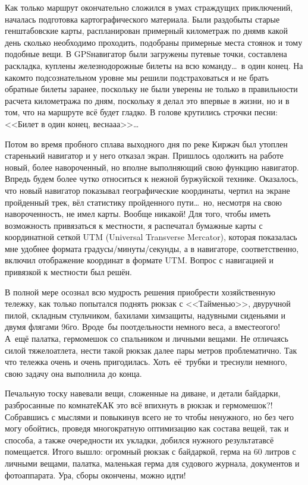 Как только маршрут окончательно сложился в умах страждущих приключений, началась подготовка картографического материала. Были раздобыты старые генштабовские карты, распланирован примерный километраж по дням\mdash в какой день сколько необходимо проходить, подобраны примерные места стоянок и тому подобные вещи. В GPS\sdash навигатор были загружены путевые точки, составлена раскладка, куплены железнодорожные билеты на всю команду\ldots~в один конец. На каком\sdash то подсознательном уровне мы решили подстраховаться и не брать обратные билеты заранее, поскольку не были уверены не только в правильности расчета километража по дням, поскольку я делал это впервые в жизни, но и в том, что на маршруте всё будет гладко. В голове крутились строчки песни: <<Билет в один конец, весна\sdash а\sdash а>>\ldots
 
Потом во время пробного сплава выходного дня по реке Киржач был утоплен старенький навигатор и у него отказал экран. Пришлось одолжить на работе новый, более навороченный, но вполне выполняющий свою функцию навигатор. Впредь будем более чутко относиться к нежной буржуйской технике. Оказалось, что новый навигатор показывал географические координаты, чертил на экране пройденный трек, вёл статистику пройденного пути\ldots~но, несмотря на свою навороченность, не имел карты. Вообще никакой! Для того, чтобы иметь возможность привязаться к местности, я распечатал бумажные карты с координатной сеткой UTM (Universal Transverse Mercator), которая показалась мне удобнее формата градусы/минуты/секунды, а в навигаторе, соответственно, включил отображение координат в формате UTM. Вопрос с навигацией и привязкой к местности был решён.

В полной мере осознал всю мудрость решения приобрести хозяйственную тележку, как только попытался поднять рюкзак с <<Тайменью>>, двуручной пилой, складным стульчиком, бахилами химзащиты, надувными сиденьями и двумя флягами 96\sdash го. Вроде~бы по\sdash отдельности немного веса, а вместе\mdash ого\sdash го! А~ещё палатка, гермомешок со спальником и личными вещами. Не отличаясь силой тяжелоатлета, нести такой рюкзак далее пары метров проблематично. Так что тележка очень и очень пригодилась. Хоть~её~трубки и треснули немного, свою задачу она выполнила до конца.

Печальную тоску навевали вещи, сложенные на диване, и детали байдарки, разбросанные по комнате\mdash КАК это всё впихнуть в рюкзак и гермомешок?! Собравшись с мыслями и повыкинув всего не то чтобы ненужного, но без чего могу обойтись, проведя многократную оптимизацию как состава вещей, так и способа, а также очередности их укладки, добился нужного результата\mdash всё помещается. Итого вышло: огромный рюкзак с байдаркой, герма на 60 литров с личными вещами, палатка, маленькая герма для судового журнала, документов и фотоаппарата. Ура, сборы окончены, можно идти!

